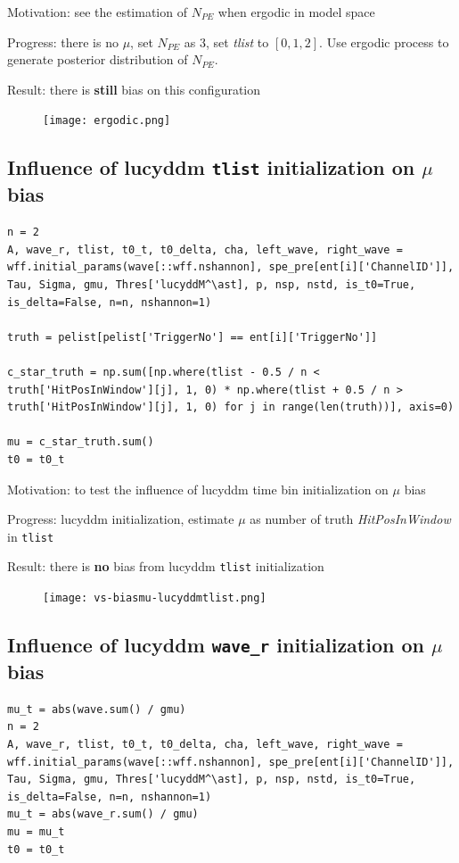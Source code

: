 \documentclass[notitlepage]{article}
\begin{document}
Motivation: see the estimation of $N_{PE}$ when ergodic in model space

Progress: there is no $\mu$, set $N_{PE}$ as 3, set \textit{tlist} to $[0, 1, 2]$. Use ergodic process to generate posterior distribution of $N_{PE}$. 

Result: there is \textbf{still} bias on this configuration

\begin{figure}[H]
    \centering
    \texttt{[image: ergodic.png]}
\end{figure}

\subsection{Influence of lucyddm \texttt{tlist} initialization on $\mu$ bias}

\begin{lstlisting}
n = 2
A, wave_r, tlist, t0_t, t0_delta, cha, left_wave, right_wave = wff.initial_params(wave[::wff.nshannon], spe_pre[ent[i]['ChannelID']], Tau, Sigma, gmu, Thres['lucyddM^\ast], p, nsp, nstd, is_t0=True, is_delta=False, n=n, nshannon=1)

truth = pelist[pelist['TriggerNo'] == ent[i]['TriggerNo']]

c_star_truth = np.sum([np.where(tlist - 0.5 / n < truth['HitPosInWindow'][j], 1, 0) * np.where(tlist + 0.5 / n > truth['HitPosInWindow'][j], 1, 0) for j in range(len(truth))], axis=0)

mu = c_star_truth.sum()
t0 = t0_t
\end{lstlisting}

Motivation: to test the influence of lucyddm time bin initialization on $\mu$ bias

Progress: lucyddm initialization, estimate $\mu$ as number of truth \textit{HitPosInWindow} in \texttt{tlist}

Result: there is \textbf{no} bias from lucyddm \texttt{tlist} initialization

\begin{figure}[H]
    \centering
    \texttt{[image: vs-biasmu-lucyddmtlist.png]}
\end{figure}

\subsection{Influence of lucyddm \texttt{wave\_r} initialization on $\mu$ bias}

\begin{lstlisting}
mu_t = abs(wave.sum() / gmu)
n = 2
A, wave_r, tlist, t0_t, t0_delta, cha, left_wave, right_wave = wff.initial_params(wave[::wff.nshannon], spe_pre[ent[i]['ChannelID']], Tau, Sigma, gmu, Thres['lucyddM^\ast], p, nsp, nstd, is_t0=True, is_delta=False, n=n, nshannon=1)
mu_t = abs(wave_r.sum() / gmu)
mu = mu_t
t0 = t0_t
\end{lstlisting}
\end{document}
